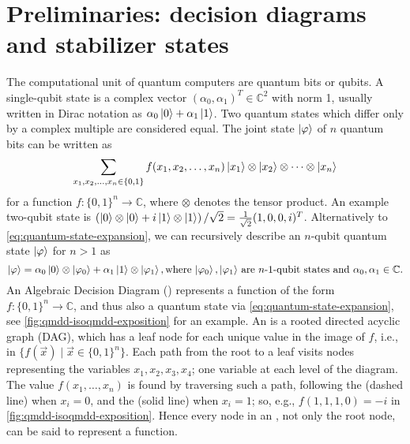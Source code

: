 \section{Preliminaries: decision diagrams and stabilizer states \label{sec:preliminaries}}


The computational unit of quantum computers are quantum bits or qubits.
A single-qubit state is a complex vector $(\alpha_0, \alpha_1)^{T} \in \mathbb{C}^2$ with norm 1, usually written in Dirac notation as $\alpha_0 \ket{0} + \alpha_1 \ket{1}$.
Two quantum states which differ only by a complex multiple are considered equal.
The joint state $\ket{\varphi}$ of $n$ quantum bits can be written as 
\begin{equation}
    \label{eq:quantum-state-expansion}
    \sum_{x_1, x_2, \dots, x_n \in \set{0,1}} f(x_1, x_2, \dots, x_n) \ket{x_1}\otimes\ket{x_2}\otimes \dots \otimes\ket{x_n}\vspace{-1em}
\end{equation}
for a function $f: \{0, 1\}^n \rightarrow \mathbb{C}$, where $\otimes$ denotes the tensor product.
An example two-qubit state is $\left( \ket{0} \otimes \ket{0} + i \ket{1} \otimes \ket{1}\right) / \sqrt{2} = \frac{1}{\sqrt{2}} (1,0,0,i)^T$.
Alternatively to \autoref{eq:quantum-state-expansion}, we can recursively describe an $n$-qubit quantum state $\ket{\varphi}$ for $n>1$ as
\begin{equation}
\ket{\varphi} = \alpha_0 \ket{0} \otimes \ket{\varphi_0} + \alpha_1 \ket{1} \otimes \ket{\varphi_1}, \text{where $\ket{\varphi_0}, \ket{\varphi_1}$ are $n$-1-qubit states and $\alpha_0,\alpha_1  \in \mathbb{C}$.}
    \label{eq:quantum-state-recursive}
\end{equation}
An Algebraic Decision Diagram (\add) represents a function of the form $f\colon \{0, 1\}^n \rightarrow \mathbb{C}$, and thus also a quantum state via \autoref{eq:quantum-state-expansion}, see \autoref{fig:qmdd-isoqmdd-exposition} for an example.
An \add is a rooted directed acyclic graph (DAG), which has a leaf node for each unique value in the image of $f$, i.e., in $\{f(\vec{x}) \mid \vec{x} \in \{0, 1\}^n \}$.
Each path from the root to a leaf visits nodes representing the variables $x_1, x_2, x_3, x_4$; one variable at each level of the diagram.
The value $f(x_1, \dots, x_n)$ is found by traversing such a path, following the  (dashed line)
 when $x_i=0$, and the   (solid line) when $x_i=1$;
 so, e.g., $f(1,1,1,0) = -i$ in \autoref{fig:qmdd-isoqmdd-exposition}.
Hence every node in an \add, not only the root node, can be said to represent a function.

